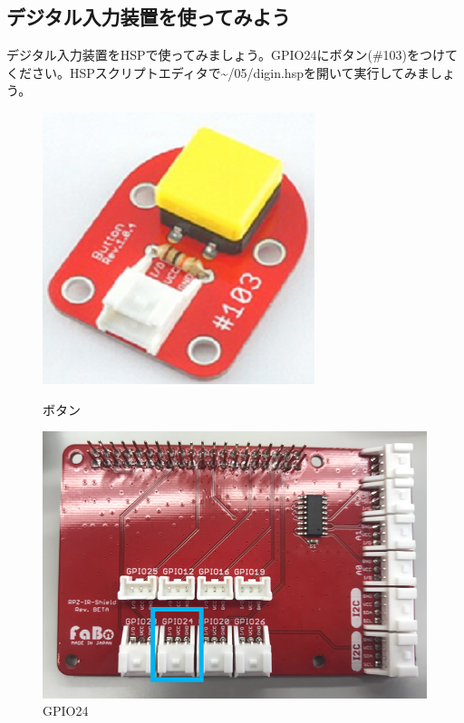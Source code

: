 \subsection{デジタル入力装置を使ってみよう}
デジタル入力装置をHSPで使ってみましょう。GPIO24にボタン(\#103)をつけてください。HSPスクリプトエディタで\textasciitilde /05/digin.hspを開いて実行してみましょう。\\
\begin{figure}[H]
  \begin{minipage}[t]{0.3\columnwidth}
    \centering
 \includegraphics[width=\linewidth]{images/chap05/text05-img028.png}
    \caption{ボタン}
  \end{minipage}
  \begin{minipage}[t]{0.5\columnwidth}
    \centering
    \includegraphics[width=\linewidth]{images/chap05/text05-img029.png}
    \caption{GPIO24}
  \end{minipage}
\end{figure}

